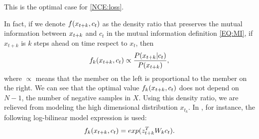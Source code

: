 This is the optimal case for \eqref{NCE:loss}.

%
%
%

In fact, if we denote $f(x_{t+k},c_t)$  as the density ratio that preserves the mutual information between $x_{t+k}$ and $c_t$ in the mutual information definition \eqref{EQ:MI}, if $x_{t+k}$ is $k$ steps ahead on time respect to $x_t$, then
\begin{equation}\label{EQ:Proportional}
f_k(x_{t+k},c_t)  \propto \frac{P(x_{t+k}| c_t)}{P(x_{t+k})},
\end{equation}
where $\propto$ means that the member on the left is proportional to the member on the right. We can see that the optimal value $f_k(x_{t+k},c_t)$ does not depend on $N-1$, the number of negative samples in $X$.
Using this density ratio, we are relieved from modeling the high dimensional distribution $x_{t_k}$. In \cite{oord_representation_2019}, for instance, the following log-bilinear model expression is used:
$$
f_k(x_{t+k},c_t) = exp(z_{t+k}^T W_k c_t).
$$


